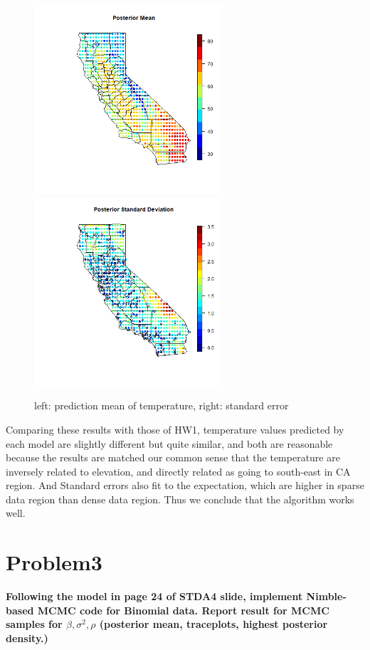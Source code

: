 \documentclass{article}
\begin{document}
\begin{figure}[!h]
    \centering
    \includegraphics[height=7cm]{prob2_posterior.png}
    \includegraphics[height=7cm]{prob2_posterior_SE.png}
    \caption{left: prediction mean of temperature, right: standard error}
\end{figure}

Comparing these results with those of HW1, temperature values predicted by each model
are slightly different but quite similar, and both are reasonable because the results are matched 
our common sense that the temperature are inversely related to elevation, 
and directly related as going to south-east in CA region.
And Standard errors also fit to the expectation, which are higher in sparse data region than
dense data region.
Thus we conclude that the algorithm works well.


\section{Problem3}
\textbf{
Following the model in page 24 of STDA4 slide, 
implement Nimble-based MCMC code for Binomial data.
Report result for MCMC samples for $\beta,\sigma^2,\rho$ (posterior mean, traceplots, highest posterior density.)
}
\end{document}
